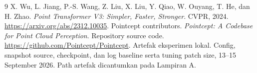 \documentclass[11pt,a4paper]{article}
\newcommand{\kode}[1]{\texttt{\detokenize{#1}}}
\begin{document}
% 
% 
% 
% 
\begin{thebibliography}{9}
X. Wu, L. Jiang, P.-S. Wang, Z. Liu, X. Liu, Y. Qiao, W. Ouyang,
T. He, dan H. Zhao.
\textit{Point Transformer V3: Simpler, Faster, Stronger}.
CVPR, 2024. \url{https://arxiv.org/abs/2312.10035}.
Pointcept contributors. \textit{Pointcept: A Codebase for Point Cloud
Perception}. Repository source code.
\url{https://github.com/Pointcept/Pointcept}.
Artefak eksperimen lokal. Config, snapshot source, checkpoint, dan log
baseline serta tuning patch size, 13--15 September 2026.
Path artefak dicantumkan pada Lampiran A.
\end{thebibliography}
\end{document}
